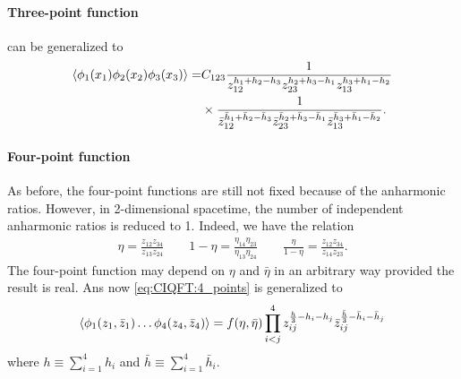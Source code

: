 \documentclass[10pt]{article}
\begin{document}
\paragraph{Three-point function}
 can be generalized to
\begin{align}
    \expval{\phi_1(x_1)\phi_2(x_2)\phi_3(x_3)}= & C_{123}\frac{1}{z_{12}^{h_1+h_2-h_3}z_{23}^{h_2+h_3-h_1}z_{13}^{h_3+h_1-h_2}}\notag                                                                                           \\
                                                & \times\frac{1}{\bar{z}_{12}^{\bar{h}_1+\bar{h}_2-\bar{h}_3}\bar{z}_{23}^{\bar{h}_2+\bar{h}_3-\bar{h}_1}\bar{z}_{13}^{\bar{h}_3+\bar{h}_1-\bar{h}_2}}.\label{eq:2dcft:3_point}
\end{align}
\paragraph{Four-point function}
As before, the four-point functions are still not fixed because of the anharmonic ratios.
However, in 2-dimensional spacetime, the number of independent anharmonic ratios is reduced to 1.
Indeed, we have the relation
\begin{align}
    \eta=\frac{z_{12}z_{34}}{z_{13}z_{24}}\quad\quad1-\eta=\frac{\eta_{14}\eta_{23}}{\eta_{13}\eta_{24}}\quad\quad\frac{\eta}{1-\eta}=\frac{z_{12}z_{34}}{z_{14}z_{23}}.
\end{align}
The four-point function may depend on $\eta$ and $\bar{\eta}$ in an arbitrary way provided the result is real.
Ans now \cref{eq:CIQFT:4_points} is generalized to
\begin{align}
    \expval{\phi_1(z_1,\bar{z}_1)\dots\phi_4(z_4,\bar{z}_4)}=f(\eta,\bar{\eta})\prod_{i<j}^4 z_{ij}^{\frac{h}{3}-h_i-h_j}\bar{z}_{ij}^{\frac{\bar{h}}{3}-\bar{h}_i-\bar{h}_j}
\end{align}
where $h\equiv\sum_{i=1}^4 h_i$ and $\bar{h}\equiv\sum_{i=1}^4\bar{h}_i$.
\end{document}
